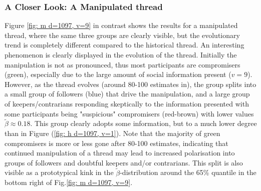 \documentclass[9pt,twocolumn,twoside,lineno]{pnas-new}
\begin{document}


\subsubsection*{A Closer Look: A Manipulated thread}
Figure \ref{fig: m d=1097, v=9} in contrast shows the results for a manipulated thread, where the same three groups are clearly visible, but the evolutionary trend is completely different compared to the historical thread. An interesting phenomenon is clearly displayed in the evolution of the thread. Initially the manipulation is not as pronounced, thus most participants are compromisers (green), especially due to the large amount of social information present ($v=9$). However, as the thread evolves (around 80-100 estimates in), the group splits into a small group of followers (blue) that drive the manipulation, and a large group of keepers/contrarians responding skeptically to the information presented with some participants being "suspicious" compromisers (red-brown) with lower values $\tilde{\beta}\approx 0.18$. This group clearly adopts some information, but to a much lower degree than in Figure (\ref{fig: h d=1097, v=1}). Note that the majority of green compromisers is more or less gone after 80-100 estimates, indicating that continued manipulation of a thread may lead to increased polarisation into groups of followers and doubtful keepers and/or contrarians. This split is also visible as a prototypical kink in the $\tilde{\beta}$-distribution around the 65\% quantile in the bottom right of Fig.\ref{fig: m d=1097, v=9}.
\end{document}
